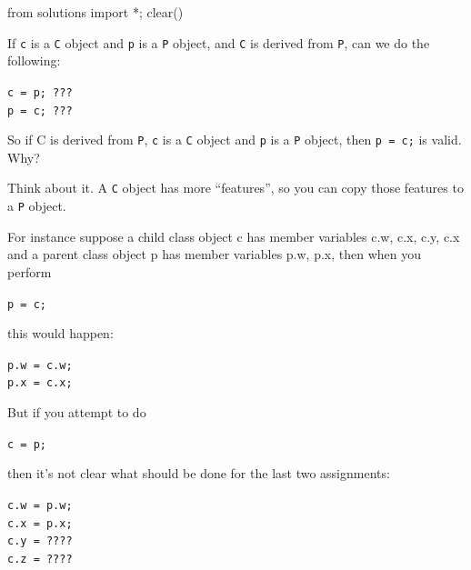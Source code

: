 \begin{python0}
from solutions import *; clear()
\end{python0}

If \verb!c! is a \verb!C! object and \verb!p! is a \verb!P! object, and
\verb!C! is derived from \verb!P!, can we do the following:
\begin{center}
\texttt{c = p; ???}\\
\texttt{p = c; ???}
\end{center}

So if C is derived from \verb!P!, \verb!c! is a \verb!C! object and
\verb!p! is a \verb!P! object, then \verb!p = c;! is valid. Why?

Think about it. A \verb!C! object has more ``features'', so you can copy
those features to a \verb!P! object.

For instance suppose a child class object c has member variables c.w,
c.x, c.y, c.x and a parent class object p has member variables p.w, p.x,
then when you perform
\begin{center}
\texttt{p = c;}
\end{center}
this would happen:
\begin{center}
\texttt{p.w = c.w;}\\
\texttt{p.x = c.x;}
\end{center}
But if you attempt to do
\begin{center}
\texttt{c = p;}
\end{center}
then it's not clear what should be done for the last two assignments:
\begin{center}
\texttt{c.w = p.w;}\\
\texttt{c.x = p.x;}\\
\texttt{c.y = ????}\\
\texttt{c.z = ????}
\end{center}

